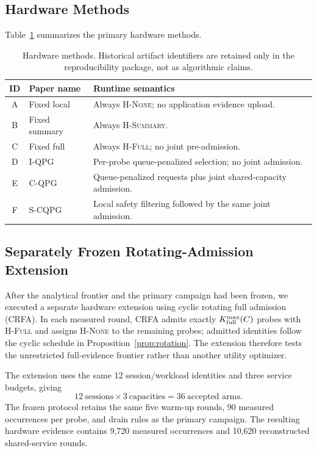 \documentclass[10pt,journal]{IEEEtran}
\newcommand{\Hnone}{\textsc{H-None}}
\newcommand{\Hsummary}{\textsc{H-Summary}}
\newcommand{\Hfull}{\textsc{H-Full}}
\newcommand{\IQPG}{\textsc{I-QPG}}
\newcommand{\CQPG}{\textsc{C-QPG}}
\newcommand{\SCQPG}{\textsc{S-CQPG}}
\newcommand{\CRFA}{\textsc{CRFA}}
\begin{document}
\subsection{Hardware Methods}
Table~\ref{tab:methods} summarizes the primary hardware methods.
\begin{table}[t]
\centering
\caption{Hardware methods. Historical artifact identifiers are retained only
in the reproducibility package, not as algorithmic claims.}
\label{tab:methods}
\small
\begin{tabular}{@{}cll@{}}
\toprule
ID & Paper name & Runtime semantics \\
\midrule
A & Fixed local & Always \Hnone; no application evidence upload. \\
B & Fixed summary & Always \Hsummary. \\
C & Fixed full & Always \Hfull; no joint pre-admission. \\
D & \IQPG & Per-probe queue-penalized selection; no joint admission. \\
E & \CQPG & Queue-penalized requests plus joint shared-capacity admission. \\
F & \SCQPG & Local safety filtering followed by the same joint admission. \\
\bottomrule
\end{tabular}
\end{table}

\subsection{Separately Frozen Rotating-Admission Extension}
\label{sec:crfa_method}
After the analytical frontier and the primary campaign had been frozen, we
executed a separate hardware extension using cyclic rotating full admission
(\CRFA{}). In each measured round, \CRFA{} admits exactly
$K_{\rm full}^{\max}(C)$ probes with \Hfull{} and assigns \Hnone{} to the
remaining probes; admitted identities follow the cyclic schedule in
Proposition~\ref{prop:rotation}. The extension therefore tests the
unrestricted full-evidence frontier rather than another utility optimizer.

The extension uses the same 12 session/workload identities and three service
budgets, giving
\[
12~\text{sessions}\times3~\text{capacities}=36~\text{accepted arms}.
\]
The frozen protocol retains the same five warm-up rounds, 90 measured
occurrences per probe, and drain rules as the primary campaign. The resulting
hardware evidence contains 9,720 measured occurrences and 10,620 reconstructed
shared-service rounds.
\end{document}
